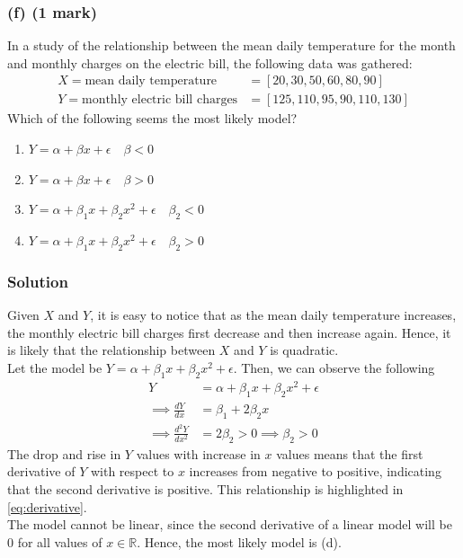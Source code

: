 \documentclass[12pt]{article}
\begin{document}
    \subsubsection*{(f) (1 mark)}
    In a study of the relationship between the mean daily temperature for the month and monthly charges on the electric bill,
    the following data was gathered:
    \begin{align*}
        X = \text{mean daily temperature} &= [ 20, 30, 50, 60, 80, 90 ] \\
        Y = \text{monthly electric bill charges} &= [ 125, 110, 95, 90, 110, 130 ]
    \end{align*}
    Which of the following seems the most likely model?
    \begin{enumerate}[label=(\alph*), noitemsep]
        \item $Y = \alpha + \beta x + \epsilon \quad \beta < 0$
        \item $Y = \alpha + \beta x + \epsilon \quad \beta > 0$
        \item $Y = \alpha + \beta_{1} x + \beta_{2} x^{2} + \epsilon \quad \beta_{2} < 0$
        \item $Y = \alpha + \beta_{1} x + \beta_{2} x^{2} + \epsilon \quad \beta_{2} > 0$
    \end{enumerate}

    \subsubsection*{Solution}
    Given $X$ and $Y$, it is easy to notice that as the mean daily temperature increases, the monthly electric bill charges
    first decrease and then increase again.
    Hence, it is likely that the relationship between $X$ and $Y$ is quadratic.
    \vspace*{5pt} \\
    Let the model be $Y = \alpha + \beta_{1} x + \beta_{2} x^{2} + \epsilon$. Then, we can observe the following
    \begin{align}
        Y &= \alpha + \beta_{1} x + \beta_{2} x^{2} + \epsilon \\
        \implies \frac{dY}{dx} &= \beta_{1} + 2 \beta_{2} x \\
        \label{eq:derivative}
        \implies \frac{d^{2}Y}{dx^{2}} &= 2 \beta_{2} > 0 \implies \beta_{2} > 0
    \end{align}
    The drop and rise in $Y$ values with increase in $x$ values means that the first derivative of $Y$ with respect to $x$
    increases from negative to positive, indicating that the second derivative is positive. This relationship is
    highlighted in \eqref{eq:derivative}.
    \vspace*{5pt} \\
    The model cannot be linear, since the second derivative of a linear model will be $0$ for all values of $x \in \mathbb{R}$.
    Hence, the most likely model is (d).
\end{document}
